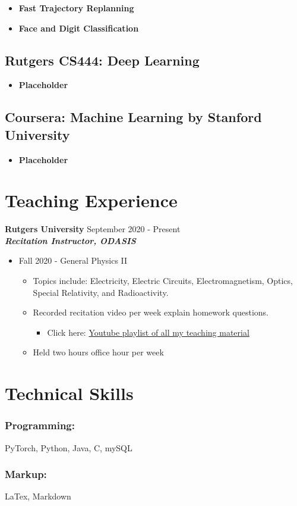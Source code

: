 \documentclass{article}
\begin{document}
\begin{itemize}
  \itemsep0em
  \item \textbf{Fast Trajectory Replanning}\\
  \item \textbf{Face and Digit Classification}
\end{itemize}

\subsection*{Rutgers CS444: Deep Learning}

\begin{itemize}
  \itemsep0em
  \item \textbf{Placeholder}
\end{itemize}

\subsection*{Coursera: Machine Learning by Stanford University}
\begin{itemize}
  \itemsep0em
  \item \textbf{Placeholder}
\end{itemize}


\section{Teaching Experience}
\textbf{Rutgers University}
\hfill{September 2020 - Present}\\
\textit{\textbf{Recitation Instructor, ODASIS}}
\begin{itemize}
  \item Fall 2020 - General Physics II
  \begin{itemize}
  	\item Topics include: Electricity, Electric Circuits, Electromagnetism, Optics, Special Relativity, and Radioactivity.
     \item Recorded recitation video per week explain homework questions.
     \begin{itemize}
		\item Click here: \href{https://www.youtube.com/playlist?list=PLhDL674NFL2ggH1tSbZzek3hs83dwfa25}{Youtube playlist of all my teaching material}
     \end{itemize}
 	 \item Held two hours office hour per week
  \end{itemize}
\end{itemize}


\section{Technical Skills}

\subsubsection{Programming:}

PyTorch, Python, Java, C, mySQL

\subsubsection{Markup:}

LaTex, Markdown
\end{document}
